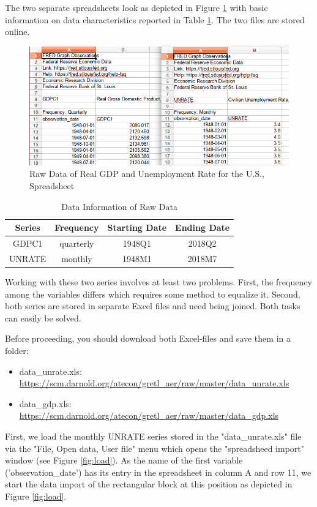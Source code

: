 \documentclass[11pt]{article}
\begin{document}
The two separate spreadsheets look as depicted in Figure \ref{fig:spread} with basic information on data characteristics reported in Table \ref{tab:datainfo}. The two files are stored online.

\begin{figure}[!h]
	\centering
	\includegraphics[width=.6\textwidth]{../figures/data_spreadsheet}
	\caption{Raw Data of Real GDP and Unemployment Rate for the U.S., Spreadsheet}
	\label{fig:spread}
\end{figure}


\begin{table}[!h]
	\centering
	\footnotesize
	\begin{tabular}{cccc}
		\hline
		Series & Frequency & Starting Date & Ending Date \\ 
		\hline 
		GDPC1	& quarterly & 1948Q1 & 2018Q2 \\ 
		UNRATE	& monthly & 1948M1 & 2018M7 \\ 
		\hline 
	\end{tabular}
	\caption{Data Information of Raw Data}
	\label{tab:datainfo}
\end{table}

Working with these two series involves at least two problems. First, the frequency among the variables differs which requires some method to equalize it. %
Second, both series are stored in separate Excel files and need being joined. Both tasks can easily be solved.

Before proceeding, you should download both Excel-files and save them in a folder:
\begin{itemize}
	\item data\_unrate.xls: \url{https://scm.darnold.org/atecon/gretl_aer/raw/master/data_unrate.xls}
	\item data\_gdp.xls: \url{https://scm.darnold.org/atecon/gretl_aer/raw/master/data_gdp.xls}
\end{itemize}

First, we load the monthly UNRATE series stored in the "data\_unrate.xls" file via the "File, Open data, User file" menu which opens the "spreadsheed import" window (see Figure \ref{fig:load}). As the name of the first variable ('observation\_date') has its entry in the spreadsheet in column A and row 11, we start the data import of the rectangular block at this position as depicted in Figure \ref{fig:load}.
\end{document}
